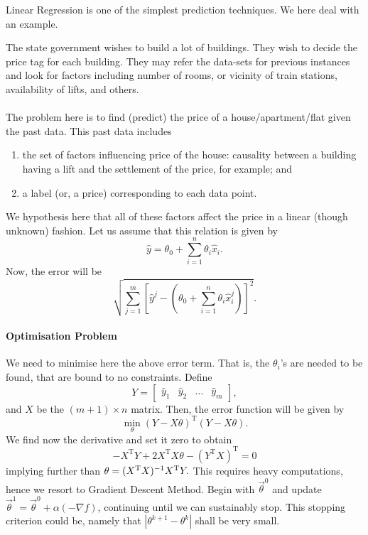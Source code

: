 Linear Regression is one of the simplest prediction 
techniques. We here deal with an example.

\begin{example}
	The state government wishes to build a lot of buildings. They wish to decide the price tag for each building. They may refer the data-sets for previous instances and look for factors including number of rooms, or vicinity of train stations, availability of lifts, and others.
	
	\paragraph{}
	The problem here is to find (predict) the price of a house/apartment/flat given the past data. This past data includes
	\begin{enumerate}
		\item the set of factors influencing price of the house: causality  between a building having a lift and the settlement of the price, for example; and
		\item a label (or, a price) corresponding to each data point.
	\end{enumerate}
	
	We hypothesis here that all of these factors affect the price in a linear (though unknown) fashion. Let us assume that this relation is given by
	$$\hat y = \theta_0 + \sum_{i=1}^n \theta_i \hat x_i.$$
	Now, the error will be
	$$\sqrt{\sum_{j=1}^m \left[ \hat y^j - \left(\theta_0 + \sum_{i=1}^n \theta_i \hat x_i^j\right)\right]^2}.$$
	
	\paragraph{Optimisation Problem}
	We need to minimise here the above error term. That is, the $\theta_i$'s are needed to be found, that are bound to no constraints. Define
	$$Y = \begin{bmatrix} \hat y_1 & \hat y_2 & \dots & \hat y_m \end{bmatrix},$$
	and $X$ be the $(m+1)\times n$ matrix. Then, the error function will be given by
	$$\min_\theta (Y - X\theta)^{\mathrm T} (Y - X\theta).$$
	We find now the derivative and set it zero to obtain
	$$-X^{\mathrm T}Y + 2X^{\mathrm T}X\theta - (Y^{\mathrm T}X)^{\mathrm T} = 0$$
	implying further than $\theta = (X^{\mathrm T}X)^{-1} X^{\mathrm T} Y.$
	This requires heavy computations, hence we resort to Gradient Descent Method. Begin with $\vec\theta^0$ and update $\vec\theta^1 = \vec\theta^0 + \alpha (-\nabla f)$, continuing until we can sustainably stop. This stopping criterion could be, namely that $|\theta^{k+1} - \theta^k|$ shall be very small.
\end{example}

